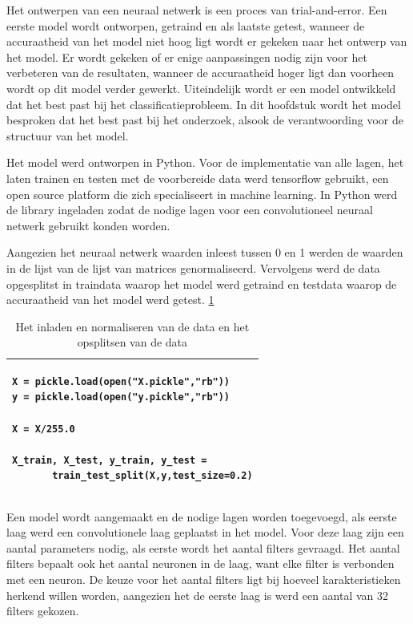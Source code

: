 Het ontwerpen van een neuraal netwerk is een proces van trial-and-error.
Een eerste model wordt ontworpen, getraind en als laatste getest, wanneer de accuraatheid van het model niet hoog ligt wordt er gekeken naar het ontwerp van het model.
Er wordt gekeken of er enige aanpassingen nodig zijn voor het verbeteren van de resultaten, wanneer de accuraatheid hoger ligt dan voorheen wordt op dit model verder gewerkt.
Uiteindelijk wordt er een model ontwikkeld dat het best past bij het classificatieprobleem.
In dit hoofdstuk wordt het model besproken dat het best past bij het onderzoek, alsook de verantwoording voor de structuur van het model.

Het model werd ontworpen in Python. Voor de implementatie van alle lagen, het laten trainen en testen met de voorbereide data werd tensorflow gebruikt, een open source platform die zich specialiseert in machine learning.
In Python werd de library ingeladen zodat de nodige lagen voor een convolutioneel neuraal netwerk gebruikt konden worden.

Aangezien het neuraal netwerk waarden inleest tussen 0 en 1 werden de waarden in de lijst van de lijst van matrices genormaliseerd.
Vervolgens werd de data opgesplitst in traindata waarop het model werd getraind en testdata waarop de accuraatheid van het model werd getest.  \ref{table:DataNormalisition}



\begin{table}[!htbp]
    \begin{tabular}{|l|}
        \hline
        \begin{lstlisting}
X = pickle.load(open("X.pickle","rb"))
y = pickle.load(open("y.pickle","rb"))
       
X = X/255.0

X_train, X_test, y_train, y_test =
       train_test_split(X,y,test_size=0.2)
        \end{lstlisting}
        \\ \hline
    \end{tabular}
    \caption{Het inladen en normaliseren van de data en het opsplitsen van de data} \label{table:DataNormalisition}
\end{table}


Een model wordt aangemaakt en de nodige lagen worden toegevoegd, als eerste laag werd een convolutionele laag geplaatst in het model.
Voor deze laag zijn een aantal parameters nodig, als eerste wordt het aantal filters gevraagd. 
Het aantal filters bepaalt ook het aantal neuronen in de laag, want elke filter is verbonden met een neuron.
De keuze voor het aantal filters ligt bij hoeveel karakteristieken herkend willen worden, aangezien het de eerste laag is werd een aantal van 32 filters gekozen.

